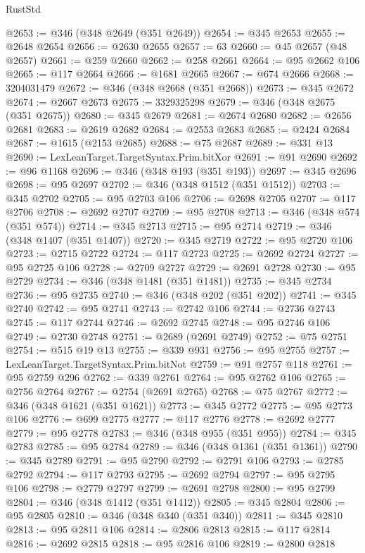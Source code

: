 \begin{lexlean}{RustStd}
\begin{coremodule}
@2653 := @346 (@348 @2649 (@351 @2649))
@2654 := @345 @2653
@2655 := @2648 @2654
@2656 := @2630 @2655
@2657 := 63
@2660 := @45 @2657 (@48 @2657)
@2661 := @259 @2660
@2662 := @258 @2661
@2664 := @95 @2662 @106
@2665 := @117 @2664
@2666 := @1681 @2665
@2667 := @674 @2666
@2668 := 3204031479
@2672 := @346 (@348 @2668 (@351 @2668))
@2673 := @345 @2672
@2674 := @2667 @2673
@2675 := 3329325298
@2679 := @346 (@348 @2675 (@351 @2675))
@2680 := @345 @2679
@2681 := @2674 @2680
@2682 := @2656 @2681
@2683 := @2619 @2682
@2684 := @2553 @2683
@2685 := @2424 @2684
@2687 := @1615 (@2153 @2685)
@2688 := @75 @2687
@2689 := @331 @13
@2690 := LexLeanTarget.TargetSyntax.Prim.bitXor
@2691 := @91 @2690
@2692 := @96 @1168
@2696 := @346 (@348 @193 (@351 @193))
@2697 := @345 @2696
@2698 := @95 @2697
@2702 := @346 (@348 @1512 (@351 @1512))
@2703 := @345 @2702
@2705 := @95 @2703 @106
@2706 := @2698 @2705
@2707 := @117 @2706
@2708 := @2692 @2707
@2709 := @95 @2708
@2713 := @346 (@348 @574 (@351 @574))
@2714 := @345 @2713
@2715 := @95 @2714
@2719 := @346 (@348 @1407 (@351 @1407))
@2720 := @345 @2719
@2722 := @95 @2720 @106
@2723 := @2715 @2722
@2724 := @117 @2723
@2725 := @2692 @2724
@2727 := @95 @2725 @106
@2728 := @2709 @2727
@2729 := @2691 @2728
@2730 := @95 @2729
@2734 := @346 (@348 @1481 (@351 @1481))
@2735 := @345 @2734
@2736 := @95 @2735
@2740 := @346 (@348 @202 (@351 @202))
@2741 := @345 @2740
@2742 := @95 @2741
@2743 := @2742 @106
@2744 := @2736 @2743
@2745 := @117 @2744
@2746 := @2692 @2745
@2748 := @95 @2746 @106
@2749 := @2730 @2748
@2751 := @2689 (@2691 @2749)
@2752 := @75 @2751
@2754 := @515 @19 @13
@2755 := @339 @931
@2756 := @95 @2755
@2757 := LexLeanTarget.TargetSyntax.Prim.bitNot
@2759 := @91 @2757 @118
@2761 := @95 @2759 @296
@2762 := @339 @2761
@2764 := @95 @2762 @106
@2765 := @2756 @2764
@2767 := @2754 (@2691 @2765)
@2768 := @75 @2767
@2772 := @346 (@348 @1621 (@351 @1621))
@2773 := @345 @2772
@2775 := @95 @2773 @106
@2776 := @699 @2775
@2777 := @117 @2776
@2778 := @2692 @2777
@2779 := @95 @2778
@2783 := @346 (@348 @955 (@351 @955))
@2784 := @345 @2783
@2785 := @95 @2784
@2789 := @346 (@348 @1361 (@351 @1361))
@2790 := @345 @2789
@2791 := @95 @2790
@2792 := @2791 @106
@2793 := @2785 @2792
@2794 := @117 @2793
@2795 := @2692 @2794
@2797 := @95 @2795 @106
@2798 := @2779 @2797
@2799 := @2691 @2798
@2800 := @95 @2799
@2804 := @346 (@348 @1412 (@351 @1412))
@2805 := @345 @2804
@2806 := @95 @2805
@2810 := @346 (@348 @340 (@351 @340))
@2811 := @345 @2810
@2813 := @95 @2811 @106
@2814 := @2806 @2813
@2815 := @117 @2814
@2816 := @2692 @2815
@2818 := @95 @2816 @106
@2819 := @2800 @2818

\end{coremodule}
\end{lexlean}
